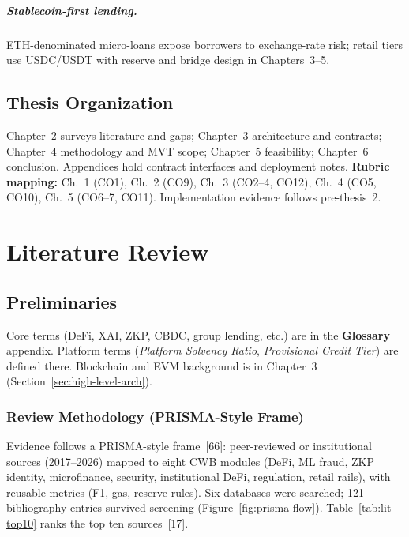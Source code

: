 \documentclass[12pt, a4paper]{report}
\begin{document}
\paragraph{Stablecoin-first lending.}
\label{sec:stablecoin-first}
ETH-denominated micro-loans expose borrowers to exchange-rate risk; retail tiers use USDC/USDT with reserve and bridge design in Chapters~3--5.

\section{Thesis Organization}
\label{sec:thesis-organization}

Chapter~2 surveys literature and gaps; Chapter~3 architecture and contracts; Chapter~4 methodology and MVT scope; Chapter~5 feasibility; Chapter~6 conclusion. Appendices hold contract interfaces and deployment notes. \textbf{Rubric mapping:} Ch.~1 (CO1), Ch.~2 (CO9), Ch.~3 (CO2--4, CO12), Ch.~4 (CO5, CO10), Ch.~5 (CO6--7, CO11). Implementation evidence follows pre-thesis~2.

\chapter{Literature Review}

\section{Preliminaries}
\label{sec:preliminaries}

Core terms (DeFi, XAI, ZKP, CBDC, group lending, etc.) are in the \textbf{Glossary} appendix. Platform terms (\textit{Platform Solvency Ratio}, \textit{Provisional Credit Tier}) are defined there. Blockchain and EVM background is in Chapter~3 (Section~\ref{sec:high-level-arch}).

\subsection{Review Methodology (PRISMA-Style Frame)}
\label{sec:lit-prisma}

Evidence follows a PRISMA-style frame~[66]: peer-reviewed or institutional sources (2017--2026) mapped to eight CWB modules (DeFi, ML fraud, ZKP identity, microfinance, security, institutional DeFi, regulation, retail rails), with reusable metrics (F1, gas, reserve rules). Six databases were searched; 121 bibliography entries survived screening (Figure~\ref{fig:prisma-flow}). Table~\ref{tab:lit-top10} ranks the top ten sources~[17].
\end{document}
